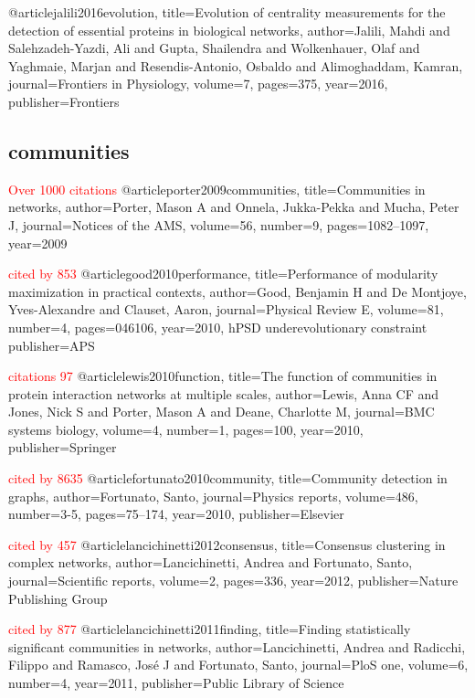 @article{jalili2016evolution,
  title={Evolution of centrality measurements for the detection of essential proteins in biological networks},
  author={Jalili, Mahdi and Salehzadeh-Yazdi, Ali and Gupta, Shailendra and Wolkenhauer, Olaf and Yaghmaie, Marjan and Resendis-Antonio, Osbaldo and Alimoghaddam, Kamran},
  journal={Frontiers in Physiology},
  volume={7},
  pages={375},
  year={2016},
  publisher={Frontiers}
}

\subsection{communities}
\textcolor{red}{Over 1000 citations}
@article{porter2009communities,
  title={Communities in networks},
  author={Porter, Mason A and Onnela, Jukka-Pekka and Mucha, Peter J},
  journal={Notices of the AMS},
  volume={56},
  number={9},
  pages={1082--1097},
  year={2009}
}

\textcolor{red}{cited by 853}
@article{good2010performance,
  title={Performance of modularity maximization in practical contexts},
  author={Good, Benjamin H and De Montjoye, Yves-Alexandre and Clauset, Aaron},
  journal={Physical Review E},
  volume={81},
  number={4},
  pages={046106},
  year={2010},\cite{bayes2011characterization} hPSD underevolutionary constraint
  publisher={APS}
}

\textcolor{red}{citations 97}
@article{lewis2010function,
  title={The function of communities in protein interaction networks at multiple scales},
  author={Lewis, Anna CF and Jones, Nick S and Porter, Mason A and Deane, Charlotte M},
  journal={BMC systems biology},
  volume={4},
  number={1},
  pages={100},
  year={2010},
  publisher={Springer}
}

\textcolor{red}{cited by 8635}
@article{fortunato2010community,
  title={Community detection in graphs},
  author={Fortunato, Santo},
  journal={Physics reports},
  volume={486},
  number={3-5},
  pages={75--174},
  year={2010},
  publisher={Elsevier}
}

\textcolor{red}{cited by 457}
@article{lancichinetti2012consensus,
  title={Consensus clustering in complex networks},
  author={Lancichinetti, Andrea and Fortunato, Santo},
  journal={Scientific reports},
  volume={2},
  pages={336},
  year={2012},
  publisher={Nature Publishing Group}
}

\textcolor{red}{cited by 877}
@article{lancichinetti2011finding,
  title={Finding statistically significant communities in networks},
  author={Lancichinetti, Andrea and Radicchi, Filippo and Ramasco, Jos{\'e} J and Fortunato, Santo},
  journal={PloS one},
  volume={6},
  number={4},
  year={2011},
  publisher={Public Library of Science}
}

